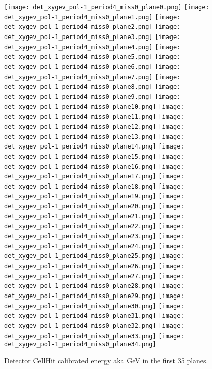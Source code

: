         \begin{figure}[h]	   
 \centering
        	\texttt{[image: det\_xygev\_pol-1\_period4\_miss0\_plane0.png]}
	 	\texttt{[image: det\_xygev\_pol-1\_period4\_miss0\_plane1.png]}
		 	\texttt{[image: det\_xygev\_pol-1\_period4\_miss0\_plane2.png]}
			 	\texttt{[image: det\_xygev\_pol-1\_period4\_miss0\_plane3.png]}
				\texttt{[image: det\_xygev\_pol-1\_period4\_miss0\_plane4.png]}	 
        	\texttt{[image: det\_xygev\_pol-1\_period4\_miss0\_plane5.png]}
	 	\texttt{[image: det\_xygev\_pol-1\_period4\_miss0\_plane6.png]}
		 	\texttt{[image: det\_xygev\_pol-1\_period4\_miss0\_plane7.png]}
			 	\texttt{[image: det\_xygev\_pol-1\_period4\_miss0\_plane8.png]}
				\texttt{[image: det\_xygev\_pol-1\_period4\_miss0\_plane9.png]}					
        	\texttt{[image: det\_xygev\_pol-1\_period4\_miss0\_plane10.png]}
	 	\texttt{[image: det\_xygev\_pol-1\_period4\_miss0\_plane11.png]}
		 	\texttt{[image: det\_xygev\_pol-1\_period4\_miss0\_plane12.png]}
			 	\texttt{[image: det\_xygev\_pol-1\_period4\_miss0\_plane13.png]}
				\texttt{[image: det\_xygev\_pol-1\_period4\_miss0\_plane14.png]}
        	\texttt{[image: det\_xygev\_pol-1\_period4\_miss0\_plane15.png]}
	 	\texttt{[image: det\_xygev\_pol-1\_period4\_miss0\_plane16.png]}
		 	\texttt{[image: det\_xygev\_pol-1\_period4\_miss0\_plane17.png]}
			 	\texttt{[image: det\_xygev\_pol-1\_period4\_miss0\_plane18.png]}
				\texttt{[image: det\_xygev\_pol-1\_period4\_miss0\_plane19.png]}
        	\texttt{[image: det\_xygev\_pol-1\_period4\_miss0\_plane20.png]}
	 	\texttt{[image: det\_xygev\_pol-1\_period4\_miss0\_plane21.png]}
		 	\texttt{[image: det\_xygev\_pol-1\_period4\_miss0\_plane22.png]}
			 	\texttt{[image: det\_xygev\_pol-1\_period4\_miss0\_plane23.png]}
				\texttt{[image: det\_xygev\_pol-1\_period4\_miss0\_plane24.png]}
        	\texttt{[image: det\_xygev\_pol-1\_period4\_miss0\_plane25.png]}
	 	\texttt{[image: det\_xygev\_pol-1\_period4\_miss0\_plane26.png]}
		 	\texttt{[image: det\_xygev\_pol-1\_period4\_miss0\_plane27.png]}
			 	\texttt{[image: det\_xygev\_pol-1\_period4\_miss0\_plane28.png]}
				\texttt{[image: det\_xygev\_pol-1\_period4\_miss0\_plane29.png]}
         	\texttt{[image: det\_xygev\_pol-1\_period4\_miss0\_plane30.png]}
	 	\texttt{[image: det\_xygev\_pol-1\_period4\_miss0\_plane31.png]}
		 	\texttt{[image: det\_xygev\_pol-1\_period4\_miss0\_plane32.png]}
			 	\texttt{[image: det\_xygev\_pol-1\_period4\_miss0\_plane33.png]}
				\texttt{[image: det\_xygev\_pol-1\_period4\_miss0\_plane34.png]}
   \caption[short]{Detector CellHit calibrated energy aka GeV in the first 35 planes.}
   \label{fig_detxgev_first}
  \end{figure}
  
